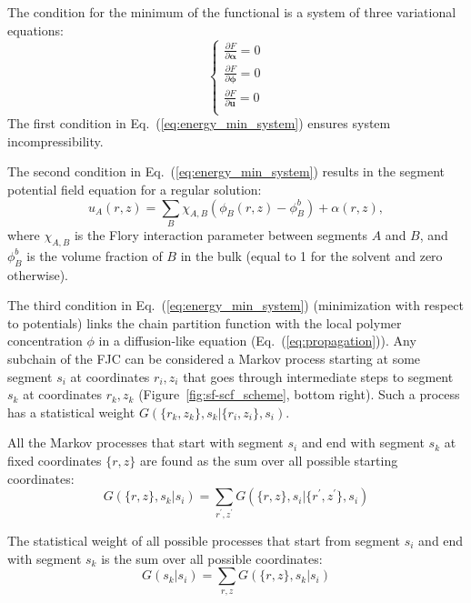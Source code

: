 \documentclass[10pt, a4paper, twocolumn]{article}
\begin{document}
The condition for the minimum of the functional is a system of three variational equations:
\begin{equation}
    \label{eq:energy_min_system}
    \begin{cases}
        \frac{\partial F}{\partial \boldsymbol{\alpha}} = 0 \\
        \frac{\partial F}{\partial \boldsymbol{\phi}} = 0 \\
        \frac{\partial F}{\partial \bm{u}} = 0 \\
    \end{cases}
\end{equation}
The first condition in Eq.~(\ref{eq:energy_min_system}) ensures system incompressibility.

The second condition in Eq.~(\ref{eq:energy_min_system}) results in the segment potential field equation for a regular solution:
\begin{equation}
    \label{eq:u-phi}
    u_A(r, z) =\sum\limits_{B} \chi_{A,B} \left(\phi_B(r,z) - \phi_B^b \right) + \alpha(r, z),
\end{equation}
where $\chi_{A,B}$ is the Flory interaction parameter between segments $A$ and $B$, and $\phi_B^b$ is the volume fraction of $B$ in the bulk (equal to 1 for the solvent and zero otherwise).

The third condition in Eq.~(\ref{eq:energy_min_system}) (minimization with respect to potentials) links the chain partition function with the local polymer concentration $\phi$ in a diffusion-like equation (Eq.~(\ref{eq:propagation})).
Any subchain of the FJC can be considered a Markov process starting at some segment $s_i$ at coordinates $r_i, z_i$ that goes through intermediate steps to segment $s_k$ at coordinates $r_k, z_k$ (Figure~\ref{fig:sf-scf_scheme}, bottom right).
Such a process has a statistical weight $G(\{r_k, z_k\}, s_k | \{r_i, z_i\}, s_i)$.

All the Markov processes that start with segment $s_i$ and end with segment $s_k$ at fixed coordinates $\{r, z\}$ are found as the sum over all possible starting coordinates:
\begin{equation}
    \label{eq:sum_to_phi}
    G(\{r, z\}, s_k | s_i) = \sum_{r^{\prime}, z^{\prime}} G(\{r, z\}, s_i | \{r^{\prime}, z^{\prime}\}, s_i)
\end{equation}


The statistical weight of all possible processes that start from segment $s_i$ and end with segment $s_k$ is the sum over all possible coordinates:
\begin{equation}
    G(s_k | s_i) = \sum_{r, z} G(\{r, z\}, s_k | s_i)
\end{equation}
\end{document}
